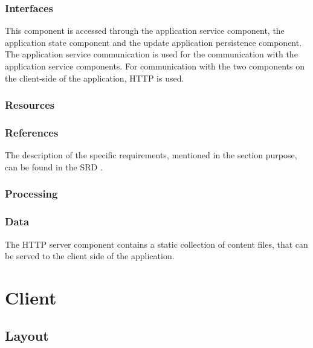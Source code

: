 \subsubsection*{Interfaces}
This component is accessed through the application service component, the application state component and the update application persistence component. The application service communication is used for the communication with the application service components. For communication with the two components on the client-side of the application, HTTP is used.

\subsubsection*{Resources}

\subsubsection*{References}
The description of the specific requirements, mentioned in the section purpose, can be found in the SRD \cite{srd}.

\subsubsection*{Processing}

\subsubsection*{Data}
The HTTP server component contains a static collection of content files, that can be served to the client side of the application.

\section{Client}
\subsection{Layout}

